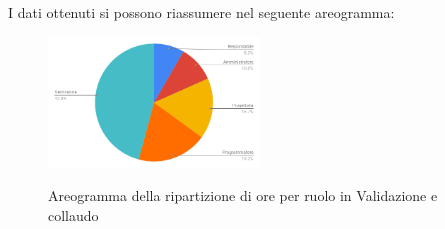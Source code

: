 I dati ottenuti si possono riassumere nel seguente areogramma:
\begin{figure}[H] 
			\centering 
				\includegraphics[width=0.5\textwidth]{res/images/areogramma_validazione.png}\\
				\caption{Areogramma della ripartizione di ore per ruolo in Validazione e collaudo}
			\label{AreogrammaValidazione}
\end{figure}


